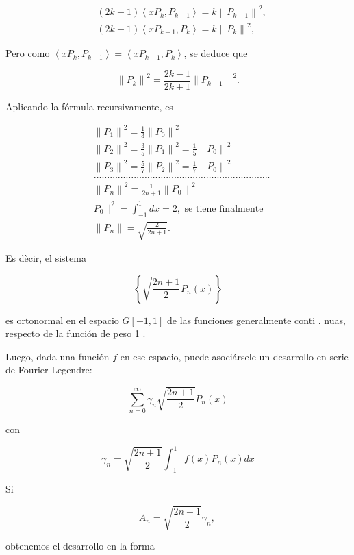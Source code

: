 \documentclass[10pt]{article}
\theoremstyle{plain}
\theoremstyle{definition}
\theoremstyle{remark}
\begin{document}
$$
\begin{aligned}
& (2 k+1)\left\langle x P_{k}, P_{k-1}\right\rangle=k\left\|P_{k-1}\right\|^{2}, \\
& (2 k-1)\left\langle x P_{k-1}, P_{k}\right\rangle=k\left\|P_{k}\right\|^{2},
\end{aligned}
$$

Pero como $\left\langle x P_{k}, P_{k-1}\right\rangle=\left\langle x P_{k-1}, P_{k}\right\rangle$, se deduce que

$$
\left\|P_{k}\right\|^{2}=\frac{2 k-1}{2 k+1}\left\|P_{k-1}\right\|^{2} .
$$

Aplicando la fórmula recursivamente, es


\begin{align*}
& \left\|P_{1}\right\|^{2}=\frac{1}{3}\left\|P_{0}\right\|^{2} \\
& \left\|P_{2}\right\|^{2}=\frac{3}{5}\left\|P_{1}\right\|^{2}=\frac{1}{5}\left\|P_{0}\right\|^{2} \\
& \left\|P_{3}\right\|^{2}=\frac{5}{7}\left\|P_{2}\right\|^{2}=\frac{1}{7}\left\|P_{0}\right\|^{2} \\
& \ldots \ldots \ldots \ldots \ldots \ldots \ldots \ldots \ldots \ldots \ldots \ldots \ldots \ldots \ldots . . . . . . . . . . . . . . . . . . . . . \\
& \left\|P_{n}\right\|^{2}=\frac{1}{2 n+1}\left\|P_{0}\right\|^{2} \\
& P_{0} \|^{2}=\int_{-1}^{1} d x=2, \text { se tiene finalmente } \\
& \left\|P_{n}\right\|=\sqrt{\frac{2}{2 n+1}} . \tag{9-9}
\end{align*}


Es dècir, el sistema

$$
\left\{\sqrt{\frac{2 n+1}{2}} P_{n}(x)\right\}
$$

es ortonormal en el espacio $G[-1,1]$ de las funciones generalmente conti . nuas, respecto de la función de peso 1 .

Luego, dada una función $f$ en ese espacio, puede asociársele un desarrollo en serie de Fourier-Legendre:

$$
\sum_{n=0}^{\infty} \gamma_{n} \sqrt{\frac{2 n+1}{2}} P_{n}(x)
$$

con

$$
\gamma_{n}=\sqrt{\frac{2 n+1}{2}} \int_{-1}^{1} f(x) P_{n}(x) d x
$$

Si

$$
A_{n}=\sqrt{\frac{2 n+1}{2}} \gamma_{n} \text {, }
$$

obtenemos el desarrollo en la forma
\end{document}
